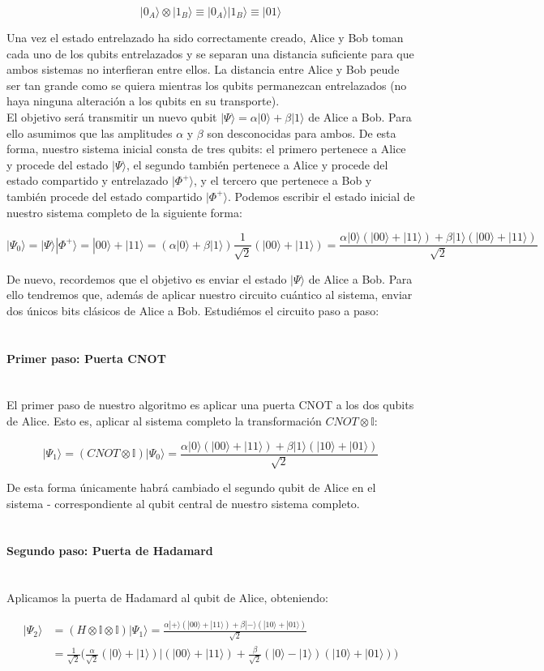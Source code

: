 \documentclass[11pt]{article}
\newcommand{\I}{\mathbb{I}}
\newcommand{\ra}{\rangle}
\newcommand{\myparagraph}[1]{\paragraph*{ \\ #1}\mbox{}\\}
\theoremstyle{plain}
\begin{document}
\[
	|0_A\ra \otimes |1_B\ra \equiv |0_A\ra|1_B\ra  \equiv |01\ra 
\]

Una vez el estado entrelazado ha sido correctamente creado, Alice y Bob toman cada uno de los qubits entrelazados y se separan una distancia suficiente para que ambos sistemas no interfieran entre ellos. La distancia entre Alice y Bob peude ser tan grande como se quiera mientras los qubits permanezcan entrelazados (no haya ninguna alteración a los qubits en su transporte). \\

El objetivo será transmitir un nuevo qubit $|\Psi\ra = \alpha|0\ra + \beta|1\ra$ de Alice a Bob. Para ello asumimos que las amplitudes $\alpha$ y $\beta$ son desconocidas para ambos. De esta forma, nuestro sistema inicial consta de tres qubits: el primero pertenece a Alice y procede del estado $|\Psi\ra$, el segundo también pertenece a Alice y procede del estado compartido y entrelazado $|\Phi^+\ra$, y el tercero que pertenece a Bob y también procede del estado compartido $|\Phi^+\ra$. Podemos escribir el estado inicial de nuestro sistema completo de la siguiente forma:

\[
	|\Psi_0\ra = |\Psi\ra|\Phi^+\ra = |00\ra + |11\ra = (\alpha|0\ra + \beta|1\ra) \frac{1}{\sqrt 2}(|00\ra + |11\ra) = \frac{\alpha|0\ra (|00\ra + |11\ra) + \beta|1\ra (|00\ra + |11\ra) }{\sqrt 2}
\]

De nuevo, recordemos que el objetivo es enviar el estado $|\Psi\ra$ de Alice a Bob. Para ello tendremos que, además de aplicar nuestro circuito cuántico al sistema, enviar dos únicos bits clásicos de Alice a Bob. Estudiémos el circuito paso a paso:

\myparagraph{Primer paso: Puerta CNOT}

El primer paso de nuestro algoritmo es aplicar una puerta CNOT a los dos qubits de Alice. Esto es, aplicar al sistema completo la transformación $CNOT \otimes \I$:


\[
	|\Psi_1\ra = (CNOT \otimes \I)|\Psi_0\ra = \frac{\alpha|0\ra (|00\ra + |11\ra) + \beta|1\ra (|10\ra + |01\ra) }{\sqrt 2}
\]

De esta forma únicamente habrá cambiado el segundo qubit de Alice en el sistema - correspondiente al qubit central de nuestro sistema completo.

\myparagraph{Segundo paso: Puerta de Hadamard}

Aplicamos la puerta de Hadamard al qubit de Alice, obteniendo:

\begin{align*}
	|\Psi_2\ra 	& = (H \otimes \I \otimes \I)|\Psi_1\ra = \frac{\alpha|+\ra (|00\ra + |11\ra) + \beta|-\ra (|10\ra + |01\ra) }{\sqrt 2} \\
				& = \frac{1}{\sqrt 2} \bigg( \frac{\alpha}{\sqrt 2}(|0\ra + |1\ra) | (|00\ra + |11\ra) + \frac{\beta}{\sqrt 2}(|0\ra - |1\ra) (|10\ra + |01\ra) \bigg)
\end{align*}
\end{document}
